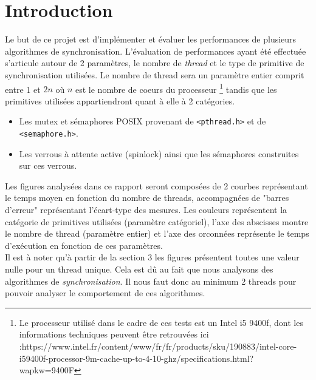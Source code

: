 



\maketitle

\newpage

\section{Introduction}

Le but de ce projet est d'implémenter et évaluer les performances de plusieurs algorithmes de synchronisation.
L'évaluation de performances ayant été effectuée s'articule autour de 2 paramètres, le nombre de \textit{thread} et le type de primitive de synchronisation utilisées.
Le nombre de thread sera un paramètre entier comprit entre 1 et $2n$ où $n$ est le nombre de coeurs du processeur \footnote{Le processeur utilisé dans le cadre de ces tests est un Intel i5 9400f, dont les informations techniques peuvent être retrouvées ici :https://www.intel.fr/content/www/fr/fr/products/sku/190883/intel-core-i59400f-processor-9m-cache-up-to-4-10-ghz/specifications.html?wapkw=9400F } tandis que les primitives utilisées appartiendront quant à elle à 2 catégories. 
\begin{itemize}
    \item Les mutex et sémaphores POSIX provenant de \texttt{<pthread.h>} et de \texttt{<semaphore.h>}.
    \item Les verrous à attente active (spinlock) ainsi que les sémaphores construites sur ces verrous.
\end{itemize}

\noindent Les figures analysées dans ce rapport seront composées de 2 courbes représentant le temps moyen en fonction du nombre de threads, accompagnées de "barres d'erreur" représentant l'écart-type des mesures.
Les couleurs représentent la catégorie de primitives utilisées (paramètre catégoriel), l'axe des abscisses montre le nombre de thread (paramètre entier) et l'axe des orconnées représente le temps d'exécution en fonction de ces paramètres. \\

\noindent Il est à noter qu'à partir de la section 3 les figures présentent toutes une valeur nulle pour un thread unique. Cela est dû au fait que nous analysons des algorithmes de \textit{synchronisation}.
Il nous faut donc au minimum 2 threads pour pouvoir analyser le comportement de ces algorithmes.

